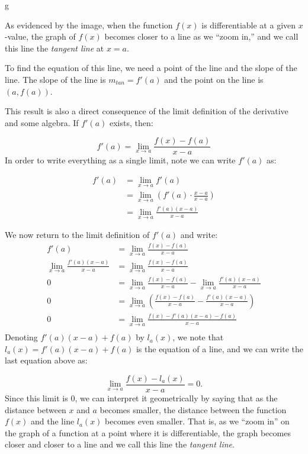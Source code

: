 g\documentclass[nooutcomes]{ximera}
\begin{document}
As evidenced by the image, when the function $f(x)$ is differentiable
at a given $x$-value, the graph of $f(x)$ becomes closer to a line as
we ``zoom in,'' and we call this line the \emph{tangent line} at $x=a$.

To find the equation of this line, we need a point of the line and the
slope of the line.  The slope of the line is $m_{tan} =f'(a)$ and the
point on the line is $(a,f(a))$.


This result is also a direct consequence of the limit definition of
the derivative and some algebra.  If $f'(a)$ exists, then:

\[
f'(a) = \lim_{x \to a} \frac{f(x)-f(a)}{x-a}
\]
In order to write everything as a single limit, note we can write $f'(a)$ as:

\begin{align*}
  f'(a) &= \lim_{x \to a} f'(a)\\
  &= \lim_{x \to a} \left(f'(a) \cdot
  \frac{x-a}{x-a}\right)\\
  &= \lim_{x \to a} \frac{f'(a)(x-a)}{x-a}
\end{align*}

We now return to the limit definition of $f'(a)$ and write: 
\begin{align*}
f'(a) &= \lim_{x \to a} \frac{f(x)-f(a)}{x-a}\\
\lim_{x \to a} \frac{f'(a)(x-a)}{x-a} &= \lim_{x \to a} \frac{f(x)-f(a)}{x-a}\\
0 &= \lim_{x \to a} \frac{f(x)-f(a)}{x-a} - \lim_{x \to a} \frac{f'(a)(x-a)}{x-a}\\
0 &= \lim_{x \to a} \left(\frac{f(x)-f(a)}{x-a} - \frac{f'(a)(x-a)}{x-a} \right)\\
0 &= \lim_{x \to a} \frac{f(x)-f'(a)(x-a) - f(a)}{x-a}\\
\end{align*} 
Denoting $ f'(a)(x-a) + f(a)$ by $l_a(x)$, we note that $l_a(x)= f'(a)(x-a) + f(a)$ is the equation of a line, and we can write the last equation above as:

\[
\lim_{x \to a} \frac{f(x)-l_a(x)}{x-a} = 0.
\]
Since this limit is $0$, we can interpret it geometrically by saying
that as the distance between $x$ and $a$ becomes smaller, the distance
between the function $f(x)$ and the line $l_a(x)$ becomes even
smaller.  That is, as we ``zoom in'' on the graph of a function at a
point where it is differentiable, the graph becomes closer and closer
to a line and we call this line the \emph{tangent line}.
\end{document}

